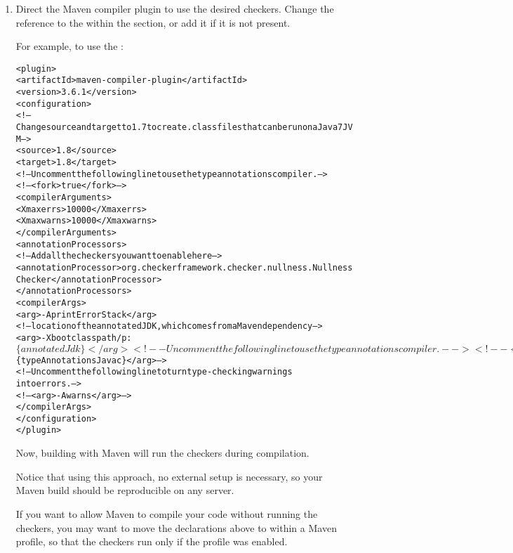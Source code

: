 \begin{enumerate}
Change the reference to the  within the 
section, or add it if it is not present.

\begin{alltt}
  <plugin>
    <!-- This plugin will set properties values using dependency information -->
    <groupId>org.apache.maven.plugins</groupId>
    <artifactId>maven-dependency-plugin</artifactId>
    <executions>
      <execution>
        <goals>
          <goal>properties</goal>
        </goals>
      </execution>
    </executions>
  </plugin>
\end{alltt}


\item Direct the Maven compiler plugin to use the desired checkers.
Change the reference to the  within the 
section, or add it if it is not present.

For example, to use the :

\begin{mysmall}
\begin{alltt}
  <plugin>
    <artifactId>maven-compiler-plugin</artifactId>
    <version>3.6.1</version>
    <configuration>
      <!-- Change source and target to 1.7 to create .class files that can be run on a Java 7 JVM -->
      <source>1.8</source>
      <target>1.8</target>
      <!-- Uncomment the following line to use the type annotations compiler. -->
      <!-- <fork>true</fork> -->
      <compilerArguments>
        <Xmaxerrs>10000</Xmaxerrs>
        <Xmaxwarns>10000</Xmaxwarns>
      </compilerArguments>
      <annotationProcessors>
        <!-- Add all the checkers you want to enable here -->
        <annotationProcessor>org.checkerframework.checker.nullness.NullnessChecker</annotationProcessor>
      </annotationProcessors>
      <compilerArgs>
        <arg>-AprintErrorStack</arg>
        <!-- location of the annotated JDK, which comes from a Maven dependency -->
        <arg>-Xbootclasspath/p:$\{annotatedJdk\}</arg>
        <!-- Uncomment the following line to use the type annotations compiler. -->
        <!-- <arg>-J-Xbootclasspath/p:$\{typeAnnotationsJavac\}</arg> -->
        <!-- Uncomment the following line to turn type-checking warnings
        into errors. -->
        <!-- <arg>-Awarns</arg> -->
      </compilerArgs>
    </configuration>
  </plugin>
\end{alltt}
\end{mysmall}

Now, building with Maven will run the checkers during compilation.

Notice that using this approach, no external setup is necessary,
so your Maven build should be reproducible on any server.

If you want to allow Maven to compile your code without running the
checkers, you may want to move the declarations above to within a Maven
profile, so that the checkers run only if the profile was enabled.

\end{enumerate}


